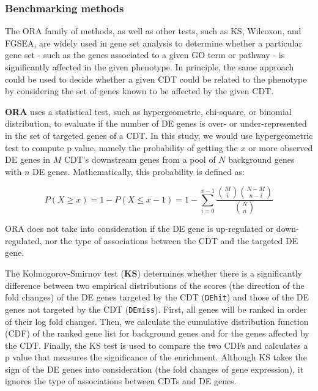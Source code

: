 \documentclass[Minh_PhD_thesis.tex]{subfiles}
\begin{document}
\subsubsection{Benchmarking methods}

The ORA family of methods, as well as other tests, such as KS, Wilcoxon, and FGSEA, are widely used in gene set analysis to determine whether  a particular gene set - such as the genes associated to a given GO term or pathway - is significantly affected in the given phenotype. In principle, the same approach could be used to decide whether a given CDT could be related to the phenotype by considering the set of genes known to be affected by the given CDT. 

\textbf{ORA} uses a statistical test, such as hypergeometric, chi-square, or binomial distribution, to evaluate if the number of DE genes is over- or under-represented in the set of targeted genes of a CDT. In this study, we would use hypergeometric test to compute p value, namely the probability of getting the $x$ or more observed DE genes in $M$ CDT's downstream genes from a pool of $N$ background genes with $n$ DE genes. Mathematically, this probability is defined as:

\begin{equation*}
P(X \geq x) = 1-P(X \leq x -1)= 1- \sum_{i=0}^{x-1} \frac{\binom{M}{i}\binom{N-M}{n-i}}{\binom{N}{n}} 
\end{equation*}

ORA does not take into consideration if the DE gene is up-regulated or down-regulated, nor the type of associations between the CDT and the targeted DE gene.

The Kolmogorov-Smirnov test (\textbf{KS}) determines whether there is a significantly difference between two empirical distributions of the scores (the direction of the fold changes) of the DE genes targeted by the CDT (\texttt{DEhit}) and those of the DE genes not targeted by the CDT (\texttt{DEmiss}). First, all genes will be ranked in order of their log fold changes. Then, we calculate the cumulative distribution function (CDF) of the ranked gene list for background genes and for the genes affected by the CDT. Finally, the KS test is used to compare the two CDFs and calculates a p value that measures the significance of the enrichment. Although KS takes the sign of the DE genes into consideration (the fold changes of gene expression), it ignores the type of associations between CDTs and DE genes.
\end{document}
